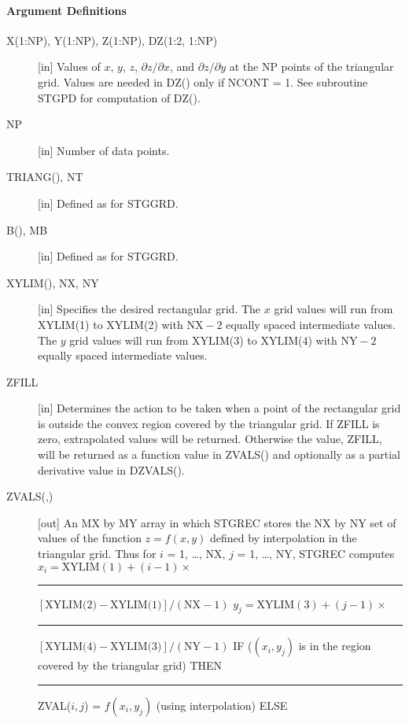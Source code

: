 \documentclass[twoside]{MATH77}
\begin{document}
\paragraph{Argument Definitions}

\begin{description}
\item[X(1:NP), Y(1:NP), Z(1:NP), DZ(1:2, 1:NP)] [in] Values of $x$, $y$,
$z$, $\partial z / \partial x$, and $\partial z / \partial y$ at the NP
points of the triangular grid.  Values are needed in DZ() only if NCONT =
1.  See subroutine STGPD for computation of DZ().  \item[NP] [in] Number
of data points.
\item[TRIANG(), NT] [in] Defined as for STGGRD.
\item[B(), MB] [in] Defined as for STGGRD.
\item[XYLIM(), NX, NY] [in] Specifies the desired rectangular
grid.  The $x$ grid values will run from XYLIM(1) to XYLIM(2) with $\text{NX}
- 2$ equally spaced intermediate values.  The $y$ grid values will run
from XYLIM(3) to XYLIM(4) with $\text{NY} - 2$ equally spaced intermediate
values.
\item[ZFILL] [in] Determines the action to be taken when a point of the
rectangular grid is outside the convex region covered by the triangular
grid.  If ZFILL is zero, extrapolated values will be returned.  Otherwise
the value, ZFILL, will be returned as a function value in ZVALS() and
optionally as a partial derivative value in DZVALS().
\item[ZVALS(,)] [out] An MX by MY array in which STGREC stores the NX
by NY set of values of the function $z = f(x, y)$ defined by
interpolation in the triangular grid.  Thus for $i$ = 1, \ldots, NX, $j$
= 1, \ldots, NY, STGREC computes
\newline
$x_i = \text{XYLIM}(1) + (i-1) \times $\newline
\rule{.75in}{0pt}$[\text{XYLIM(2)} - \text{XYLIM(1)}] /
(\text{NX} - 1)$\newline
$y_j = \text{XYLIM}(3) + (j-1) \times $\newline
\rule{.75in}{0pt}$[\text{XYLIM(4)} - \text{XYLIM(3)}] /
(\text{NY} - 1)$\newline
IF ($(x_i, y_j)$ is in the region covered by the triangular grid)
THEN \newline
\rule{.2in}{0pt}ZVAL($i,j$) = $f(x_i, y_j)$ (using
interpolation)\newline
ELSE\newline

\end{description}
\end{document}
